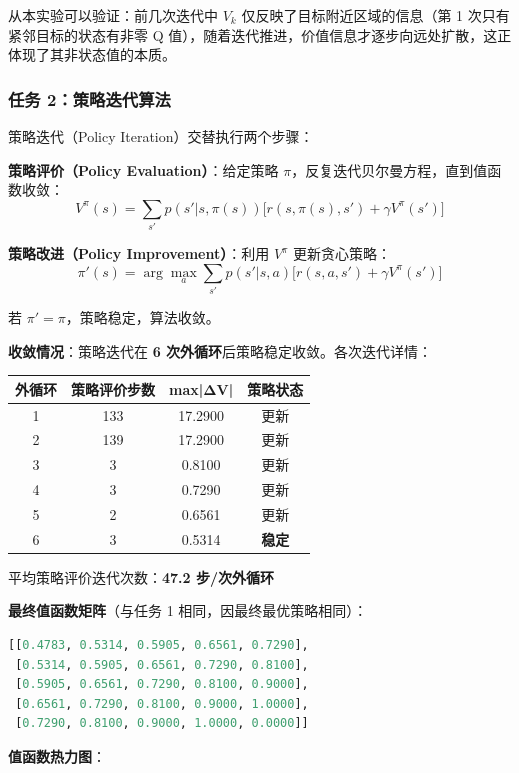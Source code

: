 \documentclass[11pt,a4paper,UTF8]{ctexart}
\numberwithin{figure}{section}
\numberwithin{table}{section}
\begin{document}
从本实验可以验证：前几次迭代中 $V_k$ 仅反映了目标附近区域的信息（第 1 次只有紧邻目标的状态有非零 Q 值），随着迭代推进，价值信息才逐步向远处扩散，这正体现了其非状态值的本质。

\subsubsection{任务 2：策略迭代算法}

策略迭代（Policy Iteration）交替执行两个步骤：

\textbf{策略评价（Policy Evaluation）}：给定策略 $\pi$，反复迭代贝尔曼方程，直到值函数收敛：
$$V^\pi(s) = \sum_{s'} p(s'|s,\pi(s))\bigl[r(s,\pi(s),s') + \gamma V^\pi(s')\bigr]$$

\textbf{策略改进（Policy Improvement）}：利用 $V^\pi$ 更新贪心策略：
$$\pi'(s) = \arg\max_a \sum_{s'} p(s'|s,a)\bigl[r(s,a,s') + \gamma V^\pi(s')\bigr]$$

若 $\pi' = \pi$，策略稳定，算法收敛。

\textbf{收敛情况}：策略迭代在 \textbf{6 次外循环}后策略稳定收敛。各次迭代详情：

\begin{table}[H]
\centering
\begin{tabular}{cccc}
\toprule
外循环 & 策略评价步数 & max|ΔV| & 策略状态 \\
\midrule
1 & 133 & 17.2900 & 更新 \\
2 & 139 & 17.2900 & 更新 \\
3 & 3 & 0.8100 & 更新 \\
4 & 3 & 0.7290 & 更新 \\
5 & 2 & 0.6561 & 更新 \\
6 & 3 & 0.5314 & \textbf{稳定} \\
\bottomrule
\end{tabular}
\end{table}

平均策略评价迭代次数：\textbf{47.2 步/次外循环}

\textbf{最终值函数矩阵}（与任务 1 相同，因最终最优策略相同）：

\begin{lstlisting}[language=Python]
[[0.4783, 0.5314, 0.5905, 0.6561, 0.7290],
 [0.5314, 0.5905, 0.6561, 0.7290, 0.8100],
 [0.5905, 0.6561, 0.7290, 0.8100, 0.9000],
 [0.6561, 0.7290, 0.8100, 0.9000, 1.0000],
 [0.7290, 0.8100, 0.9000, 1.0000, 0.0000]]
\end{lstlisting}

\textbf{值函数热力图}：
\end{document}
